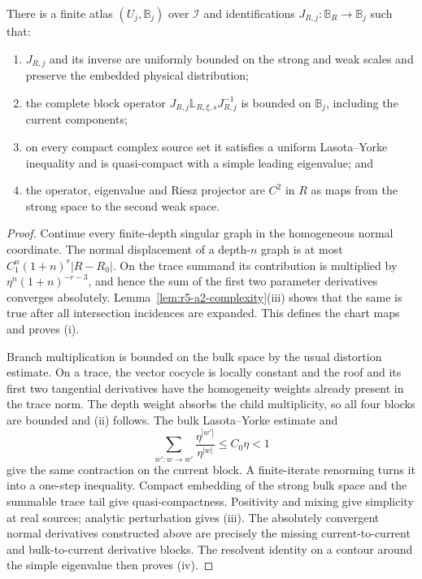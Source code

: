 \begin{theorem}
\label{thm:r5-a2-bundle}
There is a finite atlas \((U_j,\mathbb B_j)\) over \(\mathcal I\) and
identifications \(J_{R,j}:\mathbb B_R\to\mathbb B_j\) such that:
\begin{enumerate}[label=(\roman*)]
\item \(J_{R,j}\) and its inverse are uniformly bounded on the strong and
      weak scales and preserve the embedded physical distribution;
\item the complete block operator \(J_{R,j}\mathbb L_{R,\xi,s}J_{R,j}^{-1}\)
      is bounded on \(\mathbb B_j\), including the current components;
\item on every compact complex source set it satisfies a uniform
      Lasota--Yorke inequality and is quasi-compact with a simple leading
      eigenvalue; and
\item the operator, eigenvalue and Riesz projector are \(C^2\) in \(R\) as
      maps from the strong space to the second weak space.
\end{enumerate}
\end{theorem}

\begin{proof}
Continue every finite-depth singular graph in the homogeneous normal
coordinate.  The normal displacement of a depth-\(n\) graph is at most
\(C_1^n(1+n)^r|R-R_0|\).  On the trace summand its contribution is multiplied
by \(\eta^n(1+n)^{-r-3}\), and hence the sum of the first two parameter
derivatives converges absolutely.  Lemma~\ref{lem:r5-a2-complexity}(iii)
shows that the same is true after all intersection incidences are expanded.
This defines the chart maps and proves (i).

Branch multiplication is bounded on the bulk space by the usual distortion
estimate.  On a trace, the vector cocycle is locally constant and the roof and
its first two tangential derivatives have the homogeneity weights already
present in the trace norm.  The depth weight absorbs the child multiplicity,
so all four blocks are bounded and (ii) follows.  The bulk Lasota--Yorke
estimate and
\[
 \sum_{w':w\to w'}
 \frac{\eta^{|w'|}}{\eta^{|w|}}
 \le C_0\eta<1
\]
give the same contraction on the current block.  A finite-iterate renorming
turns it into a one-step inequality.  Compact embedding of the strong bulk
space and the summable trace tail give quasi-compactness.  Positivity and
mixing give simplicity at real sources; analytic perturbation gives (iii).
The absolutely convergent normal derivatives constructed above are precisely
the missing current-to-current and bulk-to-current derivative blocks.  The
resolvent identity on a contour around the simple eigenvalue then proves (iv).
\end{proof}

